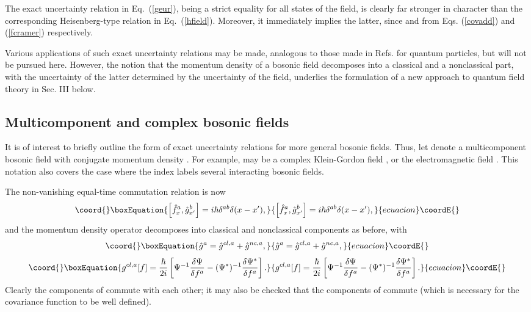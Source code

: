 \documentclass[a4paper,preprint, showpacs, aps, draft]{revtex4}
\begin{document}
{The exact uncertainty relation in Eq.~(\ref{geur}), being a strict
equality for all states of the field, is clearly far
stronger in character than the corresponding Heisenberg-type relation in 
Eq.~(\ref{hfield}).  Moreover, it immediately implies the latter, since \coordHE{} and \coordHE{} from Eqs. (\ref{covadd}) and (\ref{fcramer}) respectively. 

Various applications of such exact 
uncertainty relations may be made, analogous
to those made in Refs. \cite{hallfish, eur} for quantum particles,
but will not be pursued here.  However, the notion that the momentum
density of a bosonic field 
decomposes into a classical and a nonclassical part, with the
uncertainty of the latter determined by the uncertainty of the field,
underlies the formulation of a new approach to quantum field
theory in Sec. III below.

\subsection{Multicomponent and complex bosonic fields}
It is of interest to briefly outline the form of exact uncertainty
relations for more general bosonic fields.  
Thus, let \coordHE{}
denote a multicomponent bosonic field with conjugate momentum density
\coordHE{}.  For example, \coordHE{} may be a complex Klein-Gordon field \myHighlight{$\phi$}\coordHE{},
or the electromagnetic field \coordHE{}. This notation 
also covers the case where the index \coordHE{} labels 
several interacting bosonic fields.
 
The non-vanishing equal-time commutation relation is now
\begin{equation}\coord{}\boxEquation{
\left[\hat{f}^a_x, \hat{g}^b_{x'}\right] = i\hbar\delta^{ab}\delta(x-x'),
}{
\left[\hat{f}^a_x, \hat{g}^b_{x'}\right] = i\hbar\delta^{ab}\delta(x-x'),
}{ecuacion}\coordE{}\end{equation}
and the momentum density operator decomposes into classical and
nonclassical components as before, with
\begin{equation}\coord{}\boxEquation{
\hat{g}^a = \hat{g}^{cl, a} + \hat{g}^{nc, a} ,
}{
\hat{g}^a = \hat{g}^{cl, a} + \hat{g}^{nc, a} ,
}{ecuacion}\coordE{}\end{equation}
\begin{equation}\coord{}\boxEquation{
g^{cl, a}[f] = \frac{\hbar}{2i}\left[\Psi^{-1}\frac{\delta\Psi}{\delta
f^a} - (\Psi^*)^{-1}\frac{\delta\Psi^*}{\delta f^a}\right] .
}{
g^{cl, a}[f] = \frac{\hbar}{2i}\left[\Psi^{-1}\frac{\delta\Psi}{\delta
f^a} - (\Psi^*)^{-1}\frac{\delta\Psi^*}{\delta f^a}\right] .
}{ecuacion}\coordE{}\end{equation}
Clearly the components of \coordHE{} commute with each other;  it
may also be checked that the components of \coordHE{} commute (which
is necessary for the covariance function \coordHE{} 
to be well defined).

}
\end{document}
